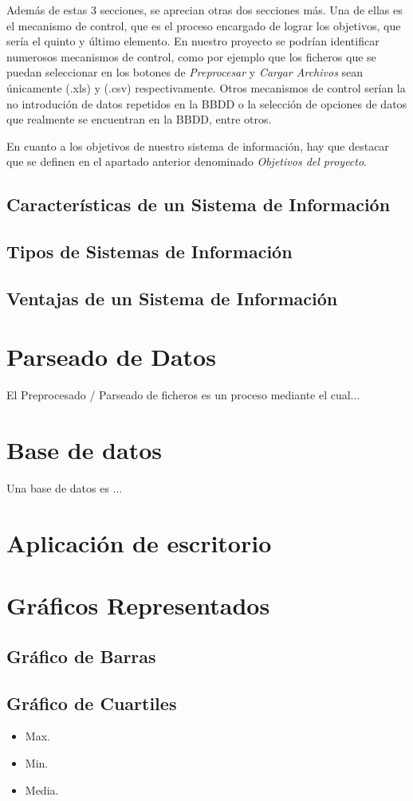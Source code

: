 Además de estas 3 secciones, se aprecian otras dos secciones más. Una de ellas es el mecanismo de control, que es el proceso encargado de lograr los objetivos, que sería el quinto y último elemento.
En nuestro proyecto se podrían identificar numerosos mecanismos de control, como por ejemplo que los ficheros que se puedan seleccionar en los botones de \emph{Preprocesar} y \emph{Cargar Archivos} sean únicamente (.xls) y (.csv) respectivamente. Otros mecanismos de control serían la no introdución de datos repetidos en la BBDD o la selección de opciones de datos que realmente se encuentran en la BBDD, entre otros.

En cuanto a los objetivos de nuestro sistema de información, hay que destacar que se definen en el apartado anterior denominado \emph{Objetivos del proyecto}.

\subsection{Características de un Sistema de Información}



\subsection{Tipos de Sistemas de Información}



\subsection{Ventajas de un Sistema de Información}



\section{Parseado de Datos}
El Preprocesado / Parseado de ficheros es un proceso mediante el cual...




\section{Base de datos}
Una base de datos es ...

\section{Aplicación de escritorio}

\section{Gráficos Representados}


\subsection{Gráfico de Barras}

\subsection{Gráfico de Cuartiles}

\begin{itemize}
	\item Max.
	\item Min.
	\item Media.
\end{itemize}

